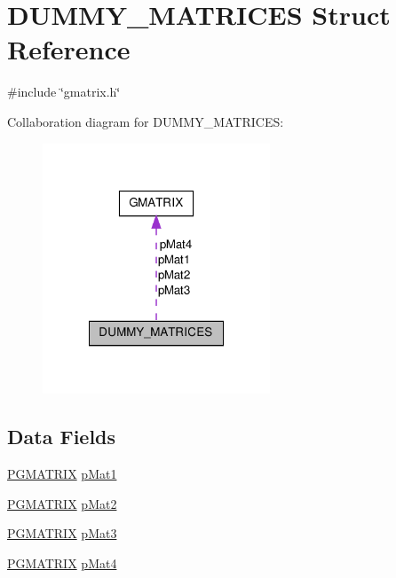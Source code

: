\hypertarget{structDUMMY__MATRICES}{\section{D\-U\-M\-M\-Y\-\_\-\-M\-A\-T\-R\-I\-C\-E\-S Struct Reference}
\label{structDUMMY__MATRICES}
}


{\ttfamily \#include \char`\"{}gmatrix.\-h\char`\"{}}



Collaboration diagram for D\-U\-M\-M\-Y\-\_\-\-M\-A\-T\-R\-I\-C\-E\-S\-:\nopagebreak
\begin{figure}[H]
\begin{center}
\leavevmode
\includegraphics[width=192pt]{structDUMMY__MATRICES__coll__graph}
\end{center}
\end{figure}
\subsection*{Data Fields}
\begin{DoxyCompactItemize}
\item 
\hyperlink{gmatrix_8h_ad8edc274a17feb9e4fca93e620253bed}{P\-G\-M\-A\-T\-R\-I\-X} \hyperlink{structDUMMY__MATRICES_a83b2fec22eaa2674a6360711702d28ac}{p\-Mat1}
\item 
\hyperlink{gmatrix_8h_ad8edc274a17feb9e4fca93e620253bed}{P\-G\-M\-A\-T\-R\-I\-X} \hyperlink{structDUMMY__MATRICES_ada47a9e57f8f5e60971d1d7a888d66b0}{p\-Mat2}
\item 
\hyperlink{gmatrix_8h_ad8edc274a17feb9e4fca93e620253bed}{P\-G\-M\-A\-T\-R\-I\-X} \hyperlink{structDUMMY__MATRICES_ac7b2907eca9bdceb1b78dc5ffb1f8299}{p\-Mat3}
\item 
\hyperlink{gmatrix_8h_ad8edc274a17feb9e4fca93e620253bed}{P\-G\-M\-A\-T\-R\-I\-X} \hyperlink{structDUMMY__MATRICES_a90bf8e9779c6de5e65b4a93341efddba}{p\-Mat4}
\end{DoxyCompactItemize}


